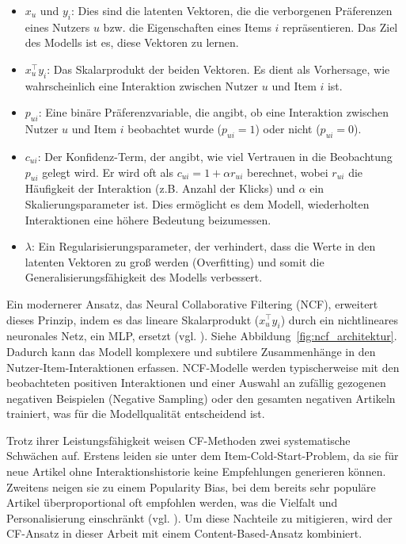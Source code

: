 \begin{itemize}
    \item $x_u$ und $y_i$: Dies sind die latenten Vektoren, die die verborgenen Präferenzen 
    eines Nutzers $u$ bzw. die Eigenschaften eines Items $i$ repräsentieren. Das Ziel des 
    Modells ist es, diese Vektoren zu lernen.
    \item $x_u^\top y_i$: Das Skalarprodukt der beiden Vektoren. Es dient als Vorhersage, 
    wie wahrscheinlich eine Interaktion zwischen Nutzer $u$ und Item $i$ ist.
    \item $p_{ui}$: Eine binäre Präferenzvariable, die angibt, ob eine Interaktion 
    zwischen Nutzer $u$ und Item $i$ beobachtet wurde ($p_{ui}=1$) oder nicht ($p_{ui}=0$).
    \item $c_{ui}$: Der Konfidenz-Term, der angibt, wie viel Vertrauen in die Beobachtung 
    $p_{ui}$ gelegt wird. Er wird oft als $c_{ui}=1+\alpha r_{ui}$ berechnet, wobei $r_{ui}$ 
    die Häufigkeit der Interaktion (z.B. Anzahl der Klicks) und $\alpha$ ein 
    Skalierungsparameter ist. Dies ermöglicht es dem Modell, wiederholten Interaktionen 
    eine höhere Bedeutung beizumessen.
    \item $\lambda$: Ein Regularisierungsparameter, der verhindert, dass die Werte in den 
    latenten Vektoren zu groß werden (Overfitting) und somit die Generalisierungsfähigkeit 
    des Modells verbessert.
\end{itemize}

Ein modernerer Ansatz, das Neural Collaborative Filtering (NCF), erweitert dieses 
Prinzip, indem es das lineare Skalarprodukt ($x_u^\top y_i$) durch ein nichtlineares 
neuronales Netz, ein \ac{MLP}, ersetzt (vgl. \cite{he_neural_2017}). Siehe Abbildung~\ref{fig:ncf_architektur}.
Dadurch kann das Modell komplexere und subtilere Zusammenhänge in den 
Nutzer-Item-Interaktionen erfassen. NCF-Modelle werden typischerweise mit den 
beobachteten positiven Interaktionen und einer Auswahl an zufällig gezogenen 
negativen Beispielen (Negative Sampling) oder den gesamten negativen Artikeln trainiert, 
was für die Modellqualität entscheidend ist.


Trotz ihrer Leistungsfähigkeit weisen CF-Methoden zwei systematische Schwächen auf. 
Erstens leiden sie unter dem Item-Cold-Start-Problem, da sie für neue Artikel ohne 
Interaktionshistorie keine Empfehlungen generieren können. Zweitens neigen sie zu 
einem Popularity Bias, bei dem bereits sehr populäre Artikel überproportional oft 
empfohlen werden, was die Vielfalt und Personalisierung einschränkt 
(vgl. \cite{Abdollahpouri_Popularity_Bias_2019}). Um diese Nachteile zu mitigieren, 
wird der CF-Ansatz in dieser Arbeit mit einem Content-Based-Ansatz kombiniert.

